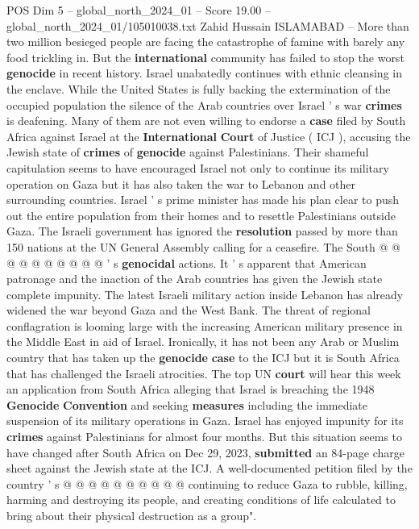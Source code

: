 \begin{textsample}{POS Dim 5 – global\_north\_2024\_01 – Score 19.00 – global\_north\_2024\_01/105010038.txt}  \label{ex:f5_pos_119}
Zahid Hussain ISLAMABAD -- More than two million besieged people are facing the catastrophe of famine with barely any food trickling in.
But the \textbf{international} community has failed to stop the worst \textbf{genocide} in recent history.
Israel unabatedly continues with ethnic cleansing in the enclave.
While the United States is fully backing the extermination of the occupied population the silence of the Arab countries over Israel ' s war \textbf{crimes} is deafening.
Many of them are not even willing to endorse a \textbf{case} filed by South Africa against Israel at the \textbf{International} \textbf{Court} of Justice ( ICJ ), accusing the Jewish state of \textbf{crimes} of \textbf{genocide} against Palestinians.
Their shameful capitulation seems to have encouraged Israel not only to continue its military operation on Gaza but it has also taken the war to Lebanon and other surrounding countries.
Israel ' s prime minister has made his plan clear to push out the entire population from their homes and to resettle Palestinians outside Gaza.
The Israeli government has ignored the \textbf{resolution} passed by more than 150 nations at the UN General Assembly calling for a ceasefire.
The South @ @ @ @ @ @ @ @ @ @ ' s \textbf{genocidal} actions.
It ' s apparent that American patronage and the inaction of the Arab countries has given the Jewish state complete impunity.
The latest Israeli military action inside Lebanon has already widened the war beyond Gaza and the West Bank.
The threat of regional conflagration is looming large with the increasing American military presence in the Middle East in aid of Israel.
Ironically, it has not been any Arab or Muslim country that has taken up the \textbf{genocide} \textbf{case} to the ICJ but it is South Africa that has challenged the Israeli atrocities.
The top UN \textbf{court} will hear this week an application from South Africa alleging that Israel is breaching the 1948 \textbf{Genocide} \textbf{Convention} and seeking \textbf{measures} including the immediate suspension of its military operations in Gaza.
Israel has enjoyed impunity for its \textbf{crimes} against Palestinians for almost four months.
But this situation seems to have changed after South Africa on Dec 29, 2023, \textbf{submitted} an 84-page charge sheet against the Jewish state at the ICJ.
A well-documented petition filed by the country ' s @ @ @ @ @ @ @ @ @ @ continuing to reduce Gaza to rubble, killing, harming and destroying its people, and creating conditions of life calculated to bring about their physical destruction as a group".

\end{textsample}
